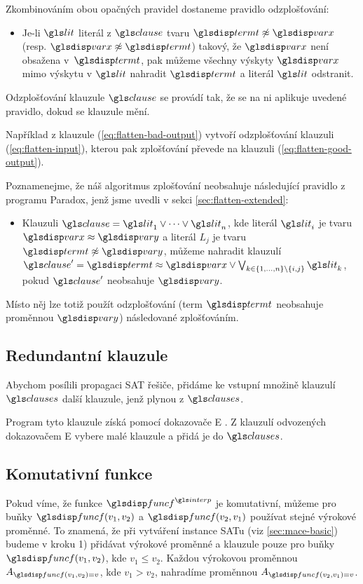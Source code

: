 Zkombinováním obou opačných pravidel dostaneme pravidlo odzplošťování:
\begin{itemize}
\item Je-li $\lit$ literál z $\clause$ tvaru $\term \not\approx \var$
  (resp. $\var \not\approx \term$) takový, že $\var$ není obsažena
  v~$\term$, pak můžeme všechny výskyty $\var$ mimo výskytu
  v $\lit$ nahradit $\term$
  a literál $\lit$ odstranit.
\end{itemize}
Odzplošťování klauzule $\clause$ se provádí tak,
že se na ni aplikuje uvedené pravidlo, dokud se klauzule mění.

Například z klauzule (\ref{eq:flatten-bad-output})
vytvoří odzplošťování klauzuli (\ref{eq:flatten-input}),
kterou pak zplošťování převede na klauzuli (\ref{eq:flatten-good-output}).

Poznamenejme, že náš algoritmus zplošťování neobsahuje následující pravidlo
z programu Paradox, jenž jsme uvedli v sekci \ref{sec:flatten-extended}:
\begin{itemize}
\item Klauzuli $\clause = \lit_1 \vee \cdots \vee \lit_n$, kde literál
  $\lit_i$ je tvaru $\var \approx \varY$ a literál $L_j$ je tvaru
  $\term \not\approx \varY$, můžeme nahradit klauzulí
  $\clause' = \term \approx \var \vee
  \bigvee_{k \in \{ 1 \comdots n \} \setminus \{ i, j \}} \lit_k$, pokud $\clause'$
  neobsahuje $\varY$.
\end{itemize}
Místo něj lze totiž použít odzplošťování (term $\term$ neobsahuje
proměnnou $\varY$) ná\-sle\-do\-va\-né zplošťováním.

\subsection{Redundantní klauzule}

Abychom posílili propagaci SAT řešiče, přidáme
ke vstupní množině klauzulí $\clauses$ další klauzule,
jenž plynou z $\clauses$.

Program \crossbow{} tyto klauzule získá pomocí dokazovače
E \cite{eprover18}.
Z klauzulí odvozených dokazovačem E vybere malé klauzule
a přidá je do $\clauses$.

\subsection{Komutativní funkce}

Pokud víme, že funkce $\func^\interp$ je komutativní,
můžeme pro buňky $\func(v_1, v_2)$ a $\func(v_2, v_1)$
používat stejné výrokové proměnné.
To znamená, že při vytváření instance SATu (viz \ref{sec:mace-basic})
budeme v kroku 1) přidávat výrokové proměnné a klauzule pouze
pro buňky $\func(v_1, v_2)$, kde $v_1 \le v_2$.
Každou výrokovou proměnnou $A_{\func(v_1, v_2) = v}$, kde $v_1 > v_2$,
nahradíme proměnnou $A_{\func(v_2, v_1) = v}$.

